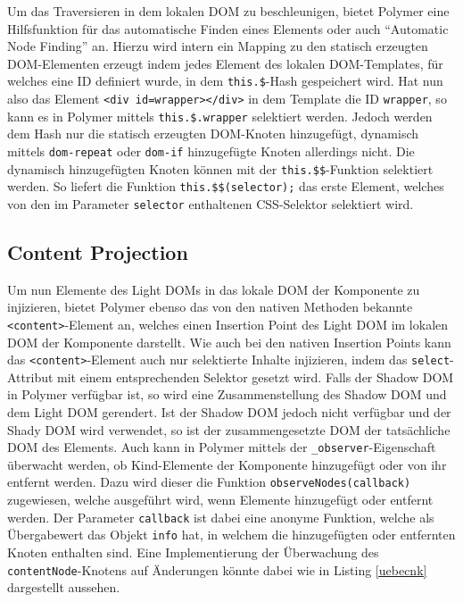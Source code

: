 Um das Traversieren in dem lokalen \ac{DOM} zu beschleunigen, bietet Polymer eine Hilfsfunktion für das automatische Finden eines Elements oder auch ``Automatic Node Finding'' an. Hierzu wird intern ein Mapping zu den statisch erzeugten \ac{DOM}-Elementen erzeugt indem jedes Element des lokalen \ac{DOM}-Templates, für welches eine ID definiert wurde, in dem \texttt{this.\$}-Hash gespeichert wird. Hat nun also das Element \texttt{\textless{}div\ id=\dq wrapper\dq\textgreater{}\textless{}/div\textgreater{}} in dem Template die ID \texttt{wrapper}, so kann es in Polymer mittels \texttt{this.\$.wrapper} selektiert werden. Jedoch werden dem Hash nur die statisch erzeugten \ac{DOM}-Knoten hinzugefügt, dynamisch mittels \texttt{dom-repeat} oder \texttt{dom-if} hinzugefügte Knoten allerdings nicht. Die dynamisch hinzugefügten Knoten können mit der \texttt{this.\$\$}-Funktion selektiert werden. So liefert die Funktion \texttt{this.\$\$(selector);} das erste Element, welches von den im Parameter \texttt{selector} enthaltenen \ac{CSS}-Selektor selektiert wird.


\subsection{Content Projection}\label{polymer-content-projection}

Um nun Elemente des Light \ac{DOM}s in das lokale \ac{DOM} der Komponente zu injizieren, bietet Polymer ebenso das von den nativen Methoden bekannte \texttt{\textless{}content\textgreater{}}-Element an, welches einen Insertion Point des Light \ac{DOM} im lokalen \ac{DOM} der Komponente darstellt. Wie auch bei den nativen Insertion Points kann das \texttt{\textless{}content\textgreater{}}-Element auch nur selektierte Inhalte injizieren, indem das \texttt{select}-Attribut mit einem entsprechenden Selektor gesetzt wird. Falls der Shadow \ac{DOM} in Polymer verfügbar ist, so wird eine Zusammenstellung des Shadow \ac{DOM} und dem Light \ac{DOM} gerendert. Ist der Shadow \ac{DOM} jedoch nicht verfügbar und der Shady \ac{DOM} wird verwendet, so ist der zusammengesetzte \ac{DOM} der tatsächliche \ac{DOM} des Elements. Auch kann in Polymer mittels der \texttt{\_observer}-Eigenschaft überwacht werden, ob Kind-Elemente der Komponente hinzugefügt oder von ihr entfernt werden. Dazu wird dieser die Funktion \texttt{observeNodes(callback)} zugewiesen, welche ausgeführt wird, wenn Elemente hinzugefügt oder entfernt werden. Der Parameter \texttt{callback} ist dabei eine anonyme Funktion, welche als Übergabewert das Objekt \texttt{info} hat, in welchem die hinzugefügten oder entfernten Knoten enthalten sind. Eine Implementierung der Überwachung des \texttt{contentNode}-Knotens auf Änderungen könnte dabei wie in Listing \ref{uebecnk} dargestellt aussehen.

